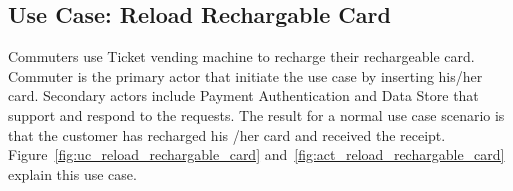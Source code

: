 \documentclass[a4paper,12pt]{report}
\begin{document}
\FloatBarrier
\subsection{Use Case: Reload Rechargable Card}
Commuters use Ticket vending machine to recharge their rechargeable card. Commuter is the primary actor that initiate the use case by inserting his/her card. Secondary actors include Payment Authentication and Data Store that support and respond to the requests. The result for a normal use case scenario is that the customer has recharged his /her card and received the receipt. Figure~\ref{fig:uc_reload_rechargable_card} and~\ref{fig:act_reload_rechargable_card} explain this use case. \\

\begin{tabular}{ | c | p{2cm} | p{7cm} |}
	

\end{tabular}
\end{document}

